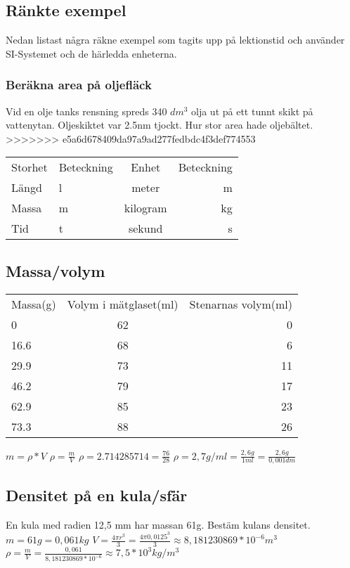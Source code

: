 \documentclass[a4paper,11pt]{article}
\begin{document}
\begin{flushleft}
\section{Ränkte exempel}
Nedan listast några räkne exempel som tagits upp på lektionstid och använder SI-Systemet och de härledda enheterna.

\subsubsection{Beräkna area på oljefläck} Vid en olje tanks rensning spreds 340 $ dm^3 $ olja ut på ett tunnt skikt på vattenytan.
Oljeskiktet var 2.5nm tjockt.\newline
Hur stor area hade oljebältet.
>>>>>>> e5a6d678409da97a9ad277fedbdc4f3def774553
\newline
\begin{tabular}{l l | c r}
  Storhet & Beteckning & Enhet & Beteckning\\
  Längd & l & meter & m\\
  Massa & m & kilogram & kg\\
  Tid & t & sekund & s\\
\end{tabular}

\subsection{Massa/volym}

\begin{tabular}{l c r}
  Massa(g) & Volym i mätglaset(ml) & Stenarnas volym(ml)\\
  0 & 62 & 0\\
  16.6 & 68 & 6\\
  29.9 & 73 & 11\\
  46.2 & 79 & 17\\
  62.9 & 85 & 23\\
  73.3 & 88 & 26\\
\end{tabular}
\newline
\newline
$ m = \rho * V  $
\newline
$ \rho = \frac{m}{V} $
\newline
$ \rho = 2.714285714 = \frac{76}{28} $\newline
$ \rho = 2,7 g/ml = \frac{2,6 g}{1 ml} = \frac{2,6 g}{0,001 dm} $
\newpage

\subsection{Densitet på en kula/sfär}
En kula med radien 12,5 mm har massan 61g.\newline
Bestäm kulans densitet.\newline
$ m = 61g = 0,061 kg $\newline
$ V = \frac{4\pi r^3}{3} = \frac{4\pi 0,0125^3}{3} \approx 8,181230869*10^{-6} m^3 $\newline
$ \rho = \frac{m}{V} = \frac{0,061}{8,181230869*10^{-6}} \approx 7,5*10^3 kg/m^3 $\newline
\newline

\end{flushleft}
\end{document}
